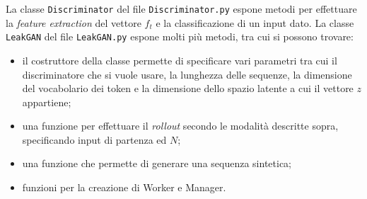 
La classe \lstinline{Discriminator} del file \lstinline{Discriminator.py} espone metodi per effettuare la \emph{feature extraction} del vettore $f_t$ e la classificazione di un input dato.
La classe \lstinline{LeakGAN} del file \lstinline{LeakGAN.py} espone molti più metodi, tra cui si possono trovare:
\begin{itemize}
  \item il costruttore della classe permette di specificare vari parametri tra cui il discriminatore che si vuole usare, la lunghezza delle sequenze, la dimensione del vocabolario dei token e la dimensione dello spazio latente a cui il vettore $z$ appartiene;
  \item una funzione per effettuare il \emph{rollout} secondo le modalità descritte sopra, specificando input di partenza ed $N$;
  \item una funzione che permette di generare una sequenza sintetica;
  \item funzioni per la creazione di Worker e Manager.
\end{itemize}
